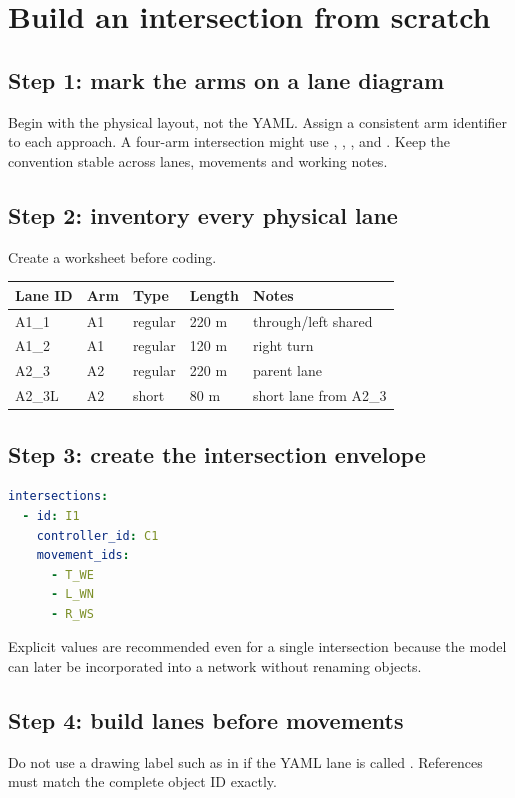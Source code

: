\chapter{Build an intersection from scratch}
\section{Step 1: mark the arms on a lane diagram}
Begin with the physical layout, not the YAML. Assign a consistent arm identifier to each approach. A four-arm intersection might use , , , and . Keep the convention stable across lanes, movements and working notes.

\section{Step 2: inventory every physical lane}
Create a worksheet before coding.
\begin{center}\begin{tabularx}{\textwidth}{llllX}\toprule
Lane ID & Arm & Type & Length & Notes\\\midrule
A1\_1 & A1 & regular & 220 m & through/left shared\\
A1\_2 & A1 & regular & 120 m & right turn\\
A2\_3 & A2 & regular & 220 m & parent lane\\
A2\_3L & A2 & short & 80 m & short lane from A2\_3\\\bottomrule
\end{tabularx}\end{center}

\section{Step 3: create the intersection envelope}
\begin{lstlisting}[language=yaml]
intersections:
  - id: I1
    controller_id: C1
    movement_ids:
      - T_WE
      - L_WN
      - R_WS
\end{lstlisting}
Explicit  values are recommended even for a single intersection because the model can later be incorporated into a network without renaming objects.

\section{Step 4: build lanes before movements}
Do not use a drawing label such as  in  if the YAML lane is called . References must match the complete object ID exactly.
